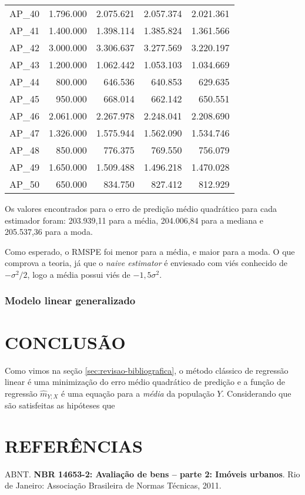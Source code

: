 \documentclass[a4paper]{article}
\begin{document}
\begin{longtable}[]{@{}lrrrr@{}}
AP\_40 & 1.796.000 & 2.075.621 & 2.057.374 & 2.021.361\tabularnewline
AP\_41 & 1.400.000 & 1.398.114 & 1.385.824 & 1.361.566\tabularnewline
AP\_42 & 3.000.000 & 3.306.637 & 3.277.569 & 3.220.197\tabularnewline
AP\_43 & 1.200.000 & 1.062.442 & 1.053.103 & 1.034.669\tabularnewline
AP\_44 & 800.000 & 646.536 & 640.853 & 629.635\tabularnewline
AP\_45 & 950.000 & 668.014 & 662.142 & 650.551\tabularnewline
AP\_46 & 2.061.000 & 2.267.978 & 2.248.041 & 2.208.690\tabularnewline
AP\_47 & 1.326.000 & 1.575.944 & 1.562.090 & 1.534.746\tabularnewline
AP\_48 & 850.000 & 776.375 & 769.550 & 756.079\tabularnewline
AP\_49 & 1.650.000 & 1.509.488 & 1.496.218 & 1.470.028\tabularnewline
AP\_50 & 650.000 & 834.750 & 827.412 & 812.929\tabularnewline
\bottomrule
\end{longtable}

Os valores encontrados para o erro de predição médio quadrático para
cada estimador foram: 203.939,11 para a média, 204.006,84 para a mediana
e 205.537,36 para a moda.

Como esperado, o RMSPE foi menor para a média, e maior para a moda. O
que comprova a teoria, já que o \emph{naive estimator} é enviesado com
viés conhecido de \(-\sigma^2/2\), logo a média possui viés de
\(-1,5\sigma^2\).

\subsubsection{Modelo linear
generalizado}\label{modelo-linear-generalizado}

\section{CONCLUSÃO}\label{conclusao}

Como vimos na seção \ref{sec:revisao-bibliografica}, o método clássico
de regressão linear é uma minimização do erro médio quadrático de
predição e a função de regressão \(\hat{m}_{Y;X}\) é uma equação para a
\emph{média} da população \(Y\). Considerando que são satisfeitas as
hipóteses que

\section*{REFERÊNCIAS}\label{referencias}

\hypertarget{refs}{}
\hypertarget{ref-NBR1465302}{}
ABNT. \textbf{NBR 14653-2: Avaliação de bens -- parte 2: Imóveis
urbanos}. Rio de Janeiro: Associação Brasileira de Normas Técnicas,
2011.
\end{document}
